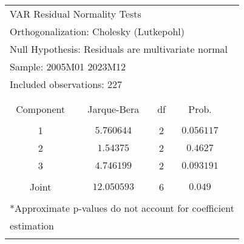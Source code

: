 \begin{tabular}{lrrrr}
\multicolumn{3}{l}{VAR Residual Normality Tests}&\multicolumn{1}{c}{}&\multicolumn{1}{c}{}\\
\multicolumn{4}{l}{Orthogonalization: Cholesky (Lutkepohl)}&\multicolumn{1}{c}{}\\
\multicolumn{5}{l}{Null Hypothesis: Residuals are multivariate normal}\\
\multicolumn{3}{l}{Sample: 2005M01 2023M12}&\multicolumn{1}{c}{}&\multicolumn{1}{c}{}\\
\multicolumn{3}{l}{Included observations: 227}&\multicolumn{1}{c}{}&\multicolumn{1}{c}{}\\
[4.5pt] \hline \\ [-4.5pt]
\multicolumn{1}{c}{}&\multicolumn{1}{c}{}&\multicolumn{1}{c}{}&\multicolumn{1}{c}{}&\multicolumn{1}{c}{}\\
\multicolumn{1}{c}{Component}&\multicolumn{1}{c}{Jarque-Bera}&\multicolumn{1}{c}{df}&\multicolumn{1}{c}{Prob.}&\multicolumn{1}{c}{}\\
[4.5pt] \hline \\ [-4.5pt]
\multicolumn{1}{c}{1}&\multicolumn{1}{c}{$5.760644$}&\multicolumn{1}{c}{2}&\multicolumn{1}{c}{$0.056117$}&\multicolumn{1}{c}{}\\
\multicolumn{1}{c}{2}&\multicolumn{1}{c}{$1.54375$}&\multicolumn{1}{c}{2}&\multicolumn{1}{c}{$0.4627$}&\multicolumn{1}{c}{}\\
\multicolumn{1}{c}{3}&\multicolumn{1}{c}{$4.746199$}&\multicolumn{1}{c}{2}&\multicolumn{1}{c}{$0.093191$}&\multicolumn{1}{c}{}\\
[4.5pt] \hline \\ [-4.5pt]
\multicolumn{1}{c}{Joint}&\multicolumn{1}{c}{$12.050593$}&\multicolumn{1}{c}{6}&\multicolumn{1}{c}{$0.049$}&\multicolumn{1}{c}{}\\
[4.5pt] \hline \\ [-4.5pt]
\multicolumn{6}{l}{*Approximate p-values do not account for coefficient}\\
\multicolumn{2}{l}{estimation}&\multicolumn{1}{c}{}&\multicolumn{1}{c}{}&\multicolumn{1}{c}{}\\
\multicolumn{1}{c}{}&\multicolumn{1}{c}{}&\multicolumn{1}{c}{}&\multicolumn{1}{c}{}&\multicolumn{1}{c}{}\\
\end{tabular}